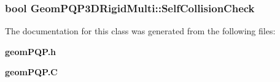 \subsubsection{\setlength{\rightskip}{0pt plus 5cm}bool Geom\-PQP3DRigid\-Multi::Self\-Collision\-Check}\label{classGeomPQP3DRigidMulti_m0}




The documentation for this class was generated from the following files:\begin{CompactItemize}
\item 
{\bf geom\-PQP.h}\item 
{\bf geom\-PQP.C}\end{CompactItemize}
